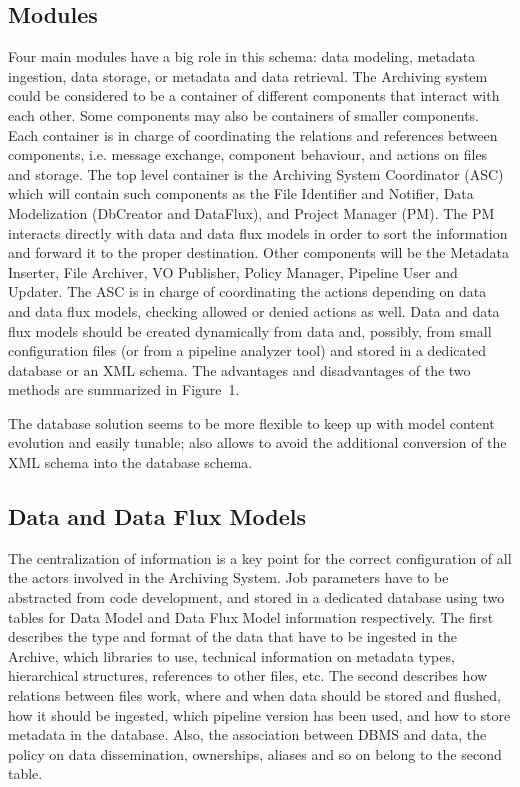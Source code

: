 \subsection{Modules}
Four main modules have a big role in this schema: data modeling, metadata ingestion, data storage, or metadata and data retrieval. The Archiving system could be considered to be a container of different components that interact with each other. Some components may also be containers of smaller components. Each container is in charge of coordinating the relations and references between components, i.e. message exchange, component behaviour, and actions on files and storage. The top level container is the Archiving System Coordinator (ASC) which will contain such components as the File Identifier and Notifier, Data Modelization (DbCreator and DataFlux), and Project Manager (PM). The PM interacts directly with data and data flux models in order to sort the information and forward it to the proper destination. Other components will be the  Metadata Inserter, File Archiver, VO Publisher, Policy Manager, Pipeline User and Updater. The ASC is in charge of coordinating the actions depending on data and data flux models, checking allowed or denied actions as well. Data and data flux models should be created dynamically from data and, possibly, from small configuration files (or from a pipeline analyzer tool) and stored in a dedicated database or an XML schema. The advantages and disadvantages of the two methods are summarized in Figure~1.


The database solution seems to be more flexible to keep up with model content evolution and easily tunable; also allows to avoid the additional conversion of the XML schema into the database schema.

\subsection{Data and  Data Flux Models}
The centralization of information is a key point for the correct configuration of all the actors involved in the Archiving System. Job parameters have to be abstracted from code development, and stored in a dedicated database using two tables for Data Model and Data Flux Model information respectively. The first describes the type and format of the data that have to be ingested in the Archive, which libraries to use, technical information on metadata types, hierarchical structures, references to other files, etc. The second describes how relations between files work, where and when data should be stored and flushed, how it should be ingested, which pipeline version has been used, and how to store metadata in the database. Also, the association between DBMS and data, the policy on data dissemination, ownerships, aliases and so on belong to the second table.

